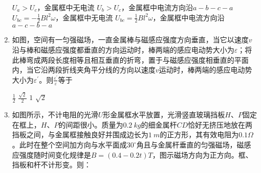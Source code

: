 \begin{enumerate}
\begin{minipage}[h!]{0.7\linewidth}
\vspace{0.3em}
\fourchoices
{$ U_a> U_c $，金属框中无电流}
{$ U_b >U_c $，金属框中电流方向沿$ a-b-c-a $}
{$U _ { b c } = - \frac { 1 } { 2 } B l ^ { 2 } \omega$，金属框中无电流}
{$U _ { b c } = \frac { 1 } { 2 } B l ^ { 2 } \omega$，金属框中电流方向沿$ a-c-b-a $ }
\vspace{0.3em}
\end{minipage}
\hfill
\begin{minipage}[h!]{0.3\linewidth}
\flushright
\vspace{0.3em}

\vspace{0.3em}
\end{minipage}






\item 
{}
如图，空间有一匀强磁场，一直金属棒与磁感应强度方向垂直，当它以速度$ v $沿与棒和磁感应强度都垂直的方向运动时，棒两端的感应电动势大小为$ \varepsilon $；将此棒弯成两段长度相等且相互垂直的折弯，置于与磁感应强度相垂直的平面内，当它沿两段折线夹角平分线的方向以速度$ v $运动时，棒两端的感应电动势大小为$\varepsilon ^ { \prime }$。则$\frac { \varepsilon ^ { \prime } } { \varepsilon }$等于  

\begin{minipage}[h!]{0.7\linewidth}
\vspace{0.3em}
\fourchoices
{$ \frac { 1 } { 2 } $}
{$ \frac { \sqrt { 2 } } { 2 } $}
{$ 1 $}
{$ \sqrt { 2 } $}
\vspace{0.3em}
\end{minipage}
\hfill
\begin{minipage}[h!]{0.3\linewidth}
\flushright
\vspace{0.3em}

\vspace{0.3em}
\end{minipage}



\item 
{}
如图所示，不计电阻的光滑$ U $形金属框水平放置，光滑竖直玻璃挡板$ H $、$ P $固定在框上，$ H $、$ P $的间距很小。质量为$ 0.2 \ kg $的细金属杆$ CD $恰好无挤压地放在两挡板之间，与金属框接触良好并围成边长为$ 1 \ m $的正方形，其有效电阻为$ 0.1 \Omega $。此时在整个空间加方向与水平面成$ 30 ^{\circ} $角且与金属杆垂直的匀强磁场，磁感应强度随时间变化规律是$ B = (0.4 -0.2t ) T $，图示磁场方向为正方向。框、挡板和杆不计形变。则：  
\begin{figure}[h!]
\centering

\end{figure}




\end{enumerate}
